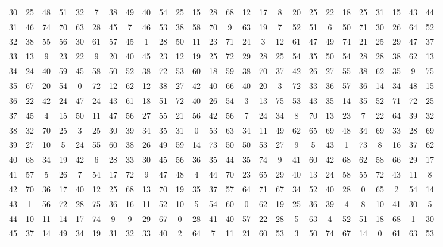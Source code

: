 \begin{table}
\begin{tabular}{c c c c c c c c c c c c c c c c c c c c c c c c c c }
30 & 25 & 48 & 51 & 32 & 7 & 38 & 49 & 40 & 54 & 25 & 15 & 28 & 68 & 12 & 17 & 8 & 20 & 25 & 22 & 18 & 25 & 31 & 15 & 43 & 44 \\
31 & 46 & 74 & 70 & 63 & 28 & 45 & 7 & 46 & 53 & 38 & 58 & 70 & 9 & 63 & 19 & 7 & 52 & 51 & 6 & 50 & 71 & 30 & 26 & 64 & 52 \\
32 & 38 & 55 & 56 & 30 & 61 & 57 & 45 & 1 & 28 & 50 & 11 & 23 & 71 & 24 & 3 & 12 & 61 & 47 & 49 & 74 & 21 & 25 & 29 & 47 & 37 \\
33 & 13 & 9 & 23 & 22 & 9 & 20 & 40 & 45 & 23 & 12 & 19 & 25 & 72 & 29 & 28 & 25 & 54 & 35 & 50 & 54 & 28 & 28 & 38 & 62 & 13 \\
34 & 24 & 40 & 59 & 45 & 58 & 50 & 52 & 38 & 72 & 53 & 60 & 18 & 59 & 38 & 70 & 37 & 42 & 26 & 27 & 55 & 38 & 62 & 35 & 9 & 75 \\
35 & 67 & 20 & 54 & 0 & 72 & 12 & 62 & 12 & 38 & 27 & 42 & 40 & 66 & 40 & 20 & 3 & 72 & 33 & 36 & 57 & 36 & 14 & 34 & 48 & 15 \\
36 & 22 & 42 & 24 & 47 & 24 & 43 & 61 & 18 & 51 & 72 & 40 & 26 & 54 & 3 & 13 & 75 & 53 & 43 & 35 & 14 & 35 & 52 & 71 & 72 & 25 \\
37 & 45 & 4 & 15 & 50 & 11 & 47 & 56 & 27 & 55 & 21 & 56 & 42 & 56 & 7 & 24 & 34 & 8 & 70 & 13 & 23 & 7 & 22 & 64 & 39 & 32 \\
38 & 32 & 70 & 25 & 3 & 25 & 30 & 39 & 34 & 35 & 31 & 0 & 53 & 63 & 34 & 11 & 49 & 62 & 65 & 69 & 48 & 34 & 69 & 33 & 28 & 69 \\
39 & 27 & 10 & 5 & 24 & 55 & 60 & 38 & 26 & 49 & 59 & 14 & 73 & 50 & 50 & 53 & 27 & 9 & 5 & 43 & 1 & 73 & 8 & 16 & 37 & 62 \\
40 & 68 & 34 & 19 & 42 & 6 & 28 & 33 & 30 & 45 & 56 & 36 & 35 & 44 & 35 & 74 & 9 & 41 & 60 & 42 & 68 & 62 & 58 & 66 & 29 & 17 \\
41 & 57 & 5 & 26 & 7 & 54 & 17 & 72 & 9 & 47 & 48 & 4 & 44 & 70 & 23 & 65 & 29 & 40 & 13 & 24 & 58 & 55 & 72 & 43 & 11 & 8 \\
42 & 70 & 36 & 17 & 40 & 12 & 25 & 68 & 13 & 70 & 19 & 35 & 37 & 57 & 64 & 71 & 67 & 34 & 52 & 40 & 28 & 0 & 65 & 2 & 54 & 14 \\
43 & 1 & 56 & 72 & 28 & 75 & 36 & 16 & 11 & 52 & 10 & 5 & 54 & 60 & 0 & 62 & 19 & 25 & 36 & 39 & 4 & 8 & 10 & 41 & 30 & 5 \\
44 & 10 & 11 & 14 & 17 & 74 & 9 & 9 & 29 & 67 & 0 & 28 & 41 & 40 & 57 & 22 & 28 & 5 & 63 & 4 & 52 & 51 & 18 & 68 & 1 & 30 \\
45 & 37 & 14 & 49 & 34 & 19 & 31 & 32 & 33 & 40 & 2 & 64 & 7 & 11 & 21 & 60 & 53 & 3 & 50 & 74 & 67 & 14 & 0 & 61 & 63 & 53 \\

\end{tabular}
\end{table}
